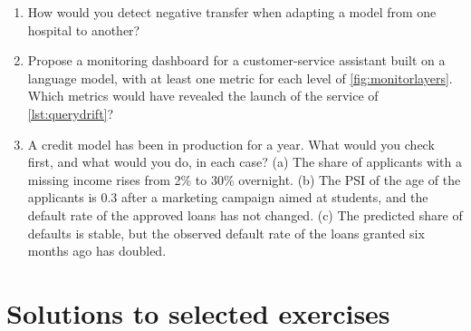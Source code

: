 \begin{enumerate}[label=\textbf{6.\arabic*},ref=6.\arabic*,leftmargin=*,itemsep=6pt]
  \item\label{exr6:negative} How would you detect negative transfer when adapting a model from one hospital to another?
  \item\label{exr6:chatbot} Propose a monitoring dashboard for a customer-service assistant built on a language model,
        with at least one metric for each level of \cref{fig:monitorlayers}. Which metrics would have revealed the launch of
        the service of \cref{lst:querydrift}?
\item\label{exr6:diagnose} A credit model has been in production for a year. What would you check first,
and what would you do, in each case? (a) The share of applicants with a missing income rises from 2\% to
30\% overnight. (b) The PSI of the age of the applicants is 0.3 after a
marketing campaign aimed at students, and the default rate of the approved loans has not changed.
(c) The predicted share of defaults is stable, but the observed default rate of the loans granted six
months ago has doubled.
\end{enumerate}

\section*{Solutions to selected exercises}

